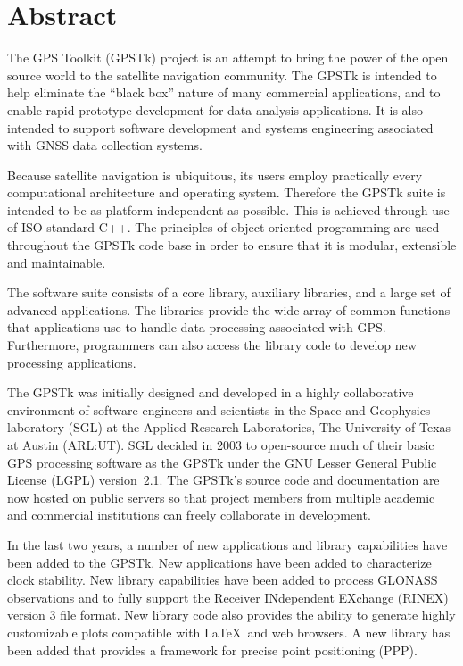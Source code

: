 
\section*{Abstract}


The GPS Toolkit (GPSTk) project is an attempt to bring the power of
the open source world to the satellite navigation community.  The GPSTk is
intended to help eliminate the ``black box'' nature of many commercial
applications, and to enable rapid prototype development for data
analysis applications. It is also intended to support software development
and systems engineering associated with GNSS data collection systems.

Because satellite navigation is ubiquitous, its users employ
practically every computational architecture and operating system.
Therefore the GPSTk suite is intended to be as platform-independent as
possible.  This is achieved through use of ISO-standard C++.  The
principles of object-oriented programming are used throughout the
GPSTk code base in order to ensure that it is modular, extensible and
maintainable.

The software suite consists of a core library, auxiliary libraries,
and a large set of advanced applications. The libraries
provide the wide array of common functions that applications use to handle
data processing associated with GPS. Furthermore, programmers can also access
the library code to develop new processing applications.

The GPSTk was initially designed and developed in a highly
collaborative environment of software engineers and scientists in the
Space and Geophysics laboratory (SGL) at the Applied Research
Laboratories, The University of Texas at Austin (ARL:UT). SGL decided
in 2003 to open-source much of their basic GPS processing software as
the GPSTk under the GNU Lesser General Public License (LGPL) \mbox{version
2.1}.  The GPSTk's source code and documentation are now hosted on
public servers so that project members from multiple academic and
commercial institutions can freely collaborate in development.

In the last two years, a number of new applications and library
capabilities have been added to the GPSTk. New applications have been
added to characterize clock stability. New library capabilities have
been added to process GLONASS observations and to fully support the
Receiver INdependent EXchange (RINEX) version 3 file format. New
library code also provides the ability to generate highly customizable
plots compatible with \LaTeX\ and web browsers. A new library has been
added that provides a framework for precise point positioning (PPP).

